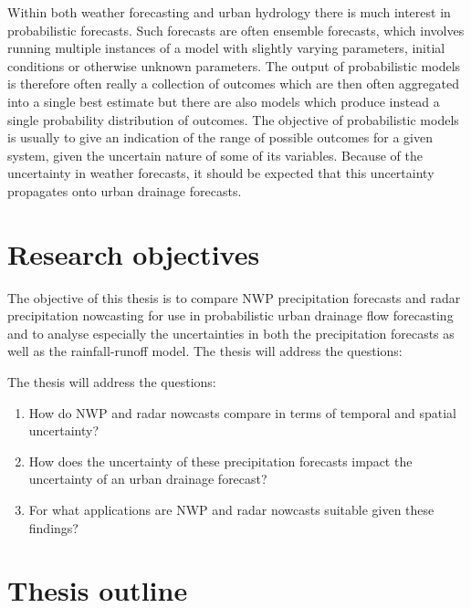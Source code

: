 Within both weather forecasting and urban hydrology there is much interest in probabilistic forecasts. Such forecasts are often ensemble forecasts, which involves running multiple instances of a model with slightly varying parameters, initial conditions or otherwise unknown parameters. The output of probabilistic models is therefore often really a collection of outcomes which are then often aggregated into a single best estimate but there are also models which produce instead a single probability distribution of outcomes. The objective of probabilistic models is usually to give an indication of the range of possible outcomes for a given system, given the uncertain nature of some of its variables. Because of the uncertainty in weather forecasts, it should be expected that this uncertainty propagates onto urban drainage forecasts. 


\section{Research objectives}
The objective of this thesis is to compare NWP precipitation forecasts and radar precipitation nowcasting for use in probabilistic urban drainage flow forecasting and to analyse especially the uncertainties in both the precipitation forecasts as well as the rainfall-runoff model. 
The thesis will address the questions:


The thesis will address the questions:
\begin{enumerate}
  \item How do NWP and radar nowcasts compare in terms of temporal and spatial uncertainty?
  \item How does the uncertainty of these precipitation forecasts impact the uncertainty of an urban drainage forecast?
  \item For what applications are NWP and radar nowcasts suitable given these findings?
\end{enumerate}



\section{Thesis outline}
